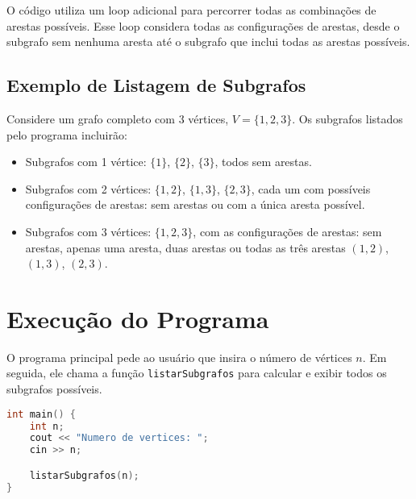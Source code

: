 \documentclass[a4paper,12pt]{article}
\begin{document}
O código utiliza um loop adicional para percorrer todas as combinações de arestas possíveis. Esse loop considera todas as configurações de arestas, desde o subgrafo sem nenhuma aresta até o subgrafo que inclui todas as arestas possíveis.

\subsection{Exemplo de Listagem de Subgrafos}
Considere um grafo completo com 3 vértices, \(V = \{1, 2, 3\}\). Os subgrafos listados pelo programa incluirão:

\begin{itemize}
    \item Subgrafos com 1 vértice: \(\{1\}\), \(\{2\}\), \(\{3\}\), todos sem arestas.
    \item Subgrafos com 2 vértices: \(\{1, 2\}\), \(\{1, 3\}\), \(\{2, 3\}\), cada um com possíveis configurações de arestas: sem arestas ou com a única aresta possível.
    \item Subgrafos com 3 vértices: \(\{1, 2, 3\}\), com as configurações de arestas: sem arestas, apenas uma aresta, duas arestas ou todas as três arestas \((1, 2)\), \((1, 3)\), \((2, 3)\).
\end{itemize}

\section{Execução do Programa}
O programa principal pede ao usuário que insira o número de vértices \(n\). Em seguida, ele chama a função \texttt{listarSubgrafos} para calcular e exibir todos os subgrafos possíveis.

\begin{lstlisting}[language=C++]
int main() {
    int n;
    cout << "Numero de vertices: ";
    cin >> n;

    listarSubgrafos(n);
}
\end{lstlisting}
\end{document}
